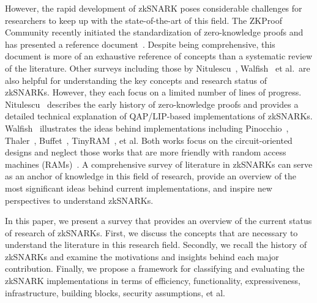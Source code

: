 \documentclass[12pt]{article}
\theoremstyle{plain}
\theoremstyle{definition}
\theoremstyle{remark}
\begin{document}
However, the rapid development of zkSNARK poses considerable challenges for researchers to keep up with the state-of-the-art of this field.
The ZKProof Community recently initiated the standardization of zero-knowledge proofs and has presented a reference document~\cite{ZKProof20}.
Despite being comprehensive, this document is more of an exhaustive reference of concepts than a systematic review of the literature.
Other surveys including those by Nitulescu~\cite{Nitulescu19}, Walfish~\cite{WalfishB15} et al.\ are also helpful for understanding the key concepts and research status of zkSNARKs.
However, they each focus on a limited number of lines of progress.
Nitulescu~\cite{Nitulescu19} describes the early history of zero-knowledge proofs and provides a detailed technical explanation of QAP/LIP-based implementations of zkSNARKs.
Walfish~\cite{WalfishB15} illustrates the ideas behind implementations including Pinocchio~\cite{ParnoHG013}, Thaler~\cite{Thaler13}, Buffet~\cite{WahbySRBW15}, TinyRAM~\cite{Ben-SassonCGTV13, Ben-SassonCTV14}, et al.
Both works focus on the circuit-oriented designs and neglect those works that are more friendly with random access machines (RAMs)~\cite{Ben-SassonCGTV13, Ben-SassonCGV16, Ben-SassonBHR18}.
A comprehensive survey of literature in zkSNARKs can serve as an anchor of knowledge in this field of research, provide an overview of the most significant ideas behind current implementations, and inspire new perspectives to understand zkSNARKs.

In this paper, we present a survey that provides an overview of the current status of research of zkSNARKs.
First, we discuss the concepts that are necessary to understand the literature in this research field.
Secondly, we recall the history of zkSNARKs and examine the motivations and insights behind each major contribution.
Finally, we propose a framework for classifying and evaluating the zkSNARK implementations in terms of efficiency, functionality, expressiveness, infrastructure, building blocks, security assumptions, et al.


\end{document}

